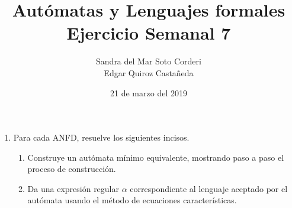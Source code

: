 \documentclass{article}
\begin{document}
    \title{
        Autómatas y Lenguajes formales \\
        Ejercicio Semanal 7
    }

    \author{
        Sandra del Mar Soto Corderi \\
        Edgar Quiroz Castañeda
    }

    \date{
        21 de marzo del 2019
    }
    
    \maketitle

    \begin{enumerate}
        \item {
            Para cada 	ANFD, resuelve los siguientes incisos.
            \begin{enumerate}
                \item Construye un autómata mínimo equivalente, mostrando paso 
                a paso el proceso de construcción.
                
                \item Da una expresión regular $\alpha$ correspondiente al 
                lenguaje aceptado por el autómata usando el método de ecuaciones
                características.
            \end{enumerate}
        }
       \end{enumerate}
\end{document}
